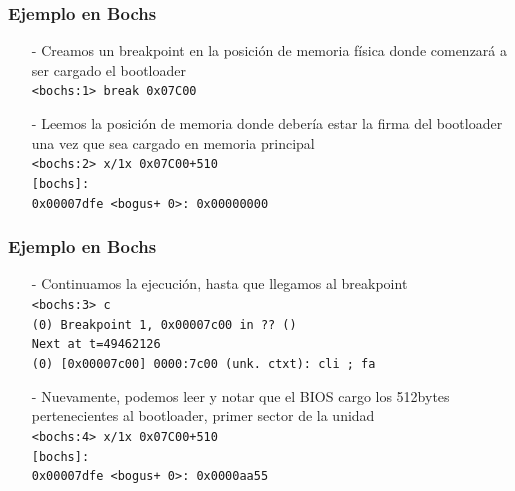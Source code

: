 \documentclass[aspectratio=169]{beamer}
\begin{document}
\begin{frame}
\frametitle{Ejemplo en Bochs}
    \begin{itemize}
        \item[-] \textcolor{verdeuca}{Creamos un breakpoint en la posición de memoria física donde comenzará a ser cargado el bootloader} \\
        \vspace{0.2cm}
        \texttt{<bochs:1> break 0x07C00} \\
        \vspace{0.7cm}
        \pause
        \item[-] \textcolor{verdeuca}{Leemos la posición de memoria donde debería estar la firma del bootloader una vez que sea cargado en memoria principal} \\
        \vspace{0.2cm}
        \texttt{<bochs:2> x/1x 0x07C00+510} \\
        \texttt{[bochs]:} \\
        \texttt{0x00007dfe <bogus+       0>:	0x00000000} \\
    \end{itemize}
\end{frame}

\begin{frame}
\frametitle{Ejemplo en Bochs}
    \begin{itemize}
        \item[-] \textcolor{verdeuca}{Continuamos la ejecución, hasta que llegamos al breakpoint} \\
        \vspace{0.2cm}
        \texttt{<bochs:3> c} \\
        \texttt{(0) Breakpoint 1, 0x00007c00 in ?? ()} \\
        \texttt{Next at t=49462126} \\
        \texttt{(0) [0x00007c00] 0000:7c00 (unk. ctxt): cli   ; fa} \\
        \pause
        \vspace{0.7cm}
        \item[-] \textcolor{verdeuca}{Nuevamente, podemos leer y notar que el BIOS cargo los 512bytes pertenecientes al bootloader, primer sector de la unidad} \\
        \vspace{0.2cm}
        \texttt{<bochs:4>  x/1x 0x07C00+510} \\
        \texttt{[bochs]:} \\
        \texttt{0x00007dfe <bogus+       0>:	0x0000aa55} \\
    \end{itemize}
\end{frame}
\end{document}
